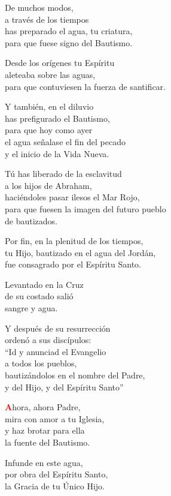 \documentclass[12pt, letterpaper]{report}
\begin{document}
De muchos modos,\\ a trav\'es de los tiempos\\ has preparado el agua, tu criatura,\\ para que fuese signo del Bautismo.

Desde los or\'igenes tu Esp\'iritu\\ aleteaba sobre las aguas,\\ para que contuviesen la fuerza de santificar.

Y tambi\'en, en el diluvio\\ has prefigurado el Bautismo,\\ para que hoy como ayer\\ el agua se\~nalase el fin del pecado\\ y el inicio de la Vida Nueva.

T\'u has liberado de la esclavitud\\ a los hijos de Abraham,\\ haci\'endoles pasar ilesos el Mar Rojo,\\ para que fuesen la imagen del futuro pueblo\\ de bautizados.

Por fin, en la plenitud de los tiempos,\\ tu Hijo, bautizado en el agua del Jord\'an, \\ fue consagrado por el Esp\'iritu Santo.

Levantado en la Cruz\\ de su costado sali\'o\\ sangre y agua.

Y despu\'es de su resurrecci\'on\\ orden\'o a sus disc\'ipulos:\\ ``Id y anunciad el Evangelio\\ a todos los pueblos,\\ bautiz\'andolos en el nombre del Padre,\\ y del Hijo, y del Esp\'iritu Santo''

\newpage

\lettrine[lines=1]{\bfseries \textcolor{red}{A}}{}\Large{hora, ahora Padre,\\ mira con amor a tu Iglesia,\\ y haz brotar para ella\\ la fuente del Bautismo.}

Infunde en este agua,\\ por obra del Esp\'iritu Santo,\\ la Gracia de tu \'Unico Hijo.
\end{document}
